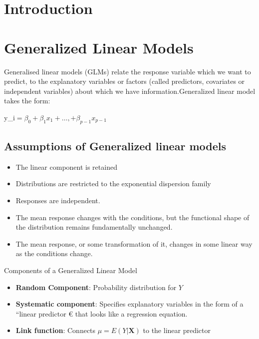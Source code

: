 \documentclass[twoside,a4paper,12pt]{article}
\begin{document}
\section{Introduction}

\section{Generalized Linear Models}

Generalised linear models (GLMs) relate the response variable which we want to predict, to the explanatory variables or factors (called predictors, covariates or independent variables) about which we have information.Generalized linear model takes the form:

y_i$ =\beta_0 + \beta_1 x_1 + \ldots, + \beta_{p-1}x_{p-1} $

\subsection{Assumptions of Generalized linear models}
\begin{itemize}
	\item The linear component is retained
	\item  Distributions are restricted to the exponential dispersion family
	\item   Responses are independent.
	\item The mean response changes with the conditions, but the functional shape of the distribution remains fundamentally unchanged.
	\item The mean response, or some transformation of it, changes in some	linear way as the conditions change.
	
\end{itemize}



{Components of a Generalized Linear Model}

\begin{itemize}
	\item \textbf{Random Component}:  Probability distribution for $Y$
	\item \textbf{Systematic component}:  Specifies explanatory variables in the form of a ``linear predictor € that looks like a regression equation.
	\item \textbf{Link function}:  Connects $\mu = E(Y|\mathbf{X})$ to the linear predictor
	
\end{itemize}
\end{document}

